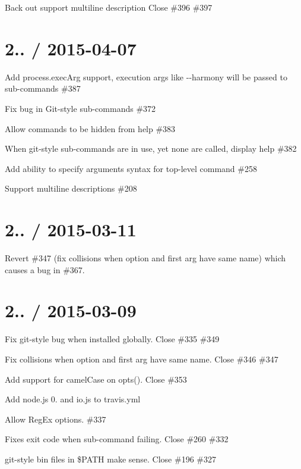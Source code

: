 
\begin{DoxyItemize}
\item Back out {\ttfamily support multiline description} Close \#396 \#397
\end{DoxyItemize}

\section*{2.. / 2015-\/04-\/07 }


\begin{DoxyItemize}
\item Add {\ttfamily process.\+exec\+Arg} support, execution args like {\ttfamily -\/-\/harmony} will be passed to sub-\/commands \#387  
\item Fix bug in Git-\/style sub-\/commands \#372 
\item Allow commands to be hidden from help \#383 
\item When git-\/style sub-\/commands are in use, yet none are called, display help \#382 
\item Add ability to specify arguments syntax for top-\/level command \#258 
\item Support multiline descriptions \#208 
\end{DoxyItemize}

\section*{2.. / 2015-\/03-\/11 }


\begin{DoxyItemize}
\item Revert \#347 (fix collisions when option and first arg have same name) which causes a bug in \#367.
\end{DoxyItemize}

\section*{2.. / 2015-\/03-\/09 }


\begin{DoxyItemize}
\item Fix git-\/style bug when installed globally. Close \#335 \#349 
\item Fix collisions when option and first arg have same name. Close \#346 \#347 
\item Add support for camel\+Case on {\ttfamily opts()}. Close \#353 
\item Add node.\+js 0. and io.\+js to travis.\+yml
\item Allow Reg\+Ex options. \#337 
\item Fixes exit code when sub-\/command failing. Close \#260 \#332 
\item git-\/style {\ttfamily bin} files in \$\+P\+A\+TH make sense. Close \#196 \#327 
\end{DoxyItemize}

